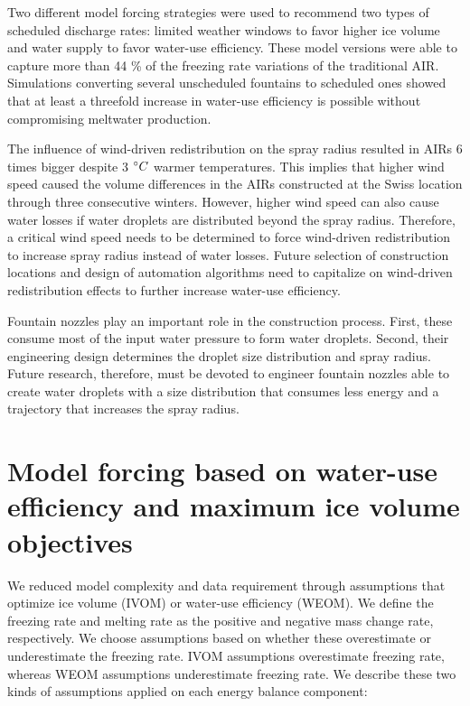 \documentclass[tc, manuscript]{copernicus}
\begin{document}
Two different model forcing strategies were used to recommend two types of scheduled discharge rates: limited weather windows to favor higher ice volume and water supply
to favor water-use
efficiency. These model versions were able to capture more than 44 \% of the freezing rate
variations of the traditional AIR. Simulations converting several unscheduled fountains to scheduled ones showed
that at least a threefold increase in water-use efficiency is possible without compromising meltwater
production.

The influence of wind-driven redistribution on the spray radius resulted in AIRs 6 times bigger despite 3 $^{\circ} C$ warmer temperatures. This implies that higher wind speed caused the volume
differences in the AIRs constructed at the Swiss location through three consecutive winters.  However, higher wind
speed can also cause water losses if water droplets are distributed beyond the spray radius. Therefore, a
critical wind speed needs to be determined to force wind-driven redistribution to increase spray
radius instead of water losses. Future selection of construction locations and design of automation
algorithms need to capitalize on wind-driven redistribution effects to further increase water-use
efficiency.

Fountain nozzles play an important role in the construction process. First, these consume most of the input water
pressure to form water droplets. Second, their engineering design determines the droplet size distribution and
spray radius. Future research, therefore, must be devoted to engineer fountain nozzles able to create water
droplets with a size distribution that consumes less energy and a trajectory that increases the
spray radius.

\appendix


\section{Model forcing based on water-use efficiency and maximum ice volume objectives} \label{sec:SEB}

We reduced model complexity and data requirement \citep{balasubramanianInfluenceMeteorologicalConditions2022} through assumptions that optimize ice volume (IVOM) or water-use efficiency (WEOM). We define the freezing rate and melting
rate as the positive and negative mass change rate, respectively. We choose assumptions based on whether these
overestimate or underestimate the freezing rate. IVOM assumptions overestimate freezing rate, whereas WEOM
assumptions underestimate freezing rate. We describe these two kinds of assumptions applied on each 
energy balance component: 
\end{document}

